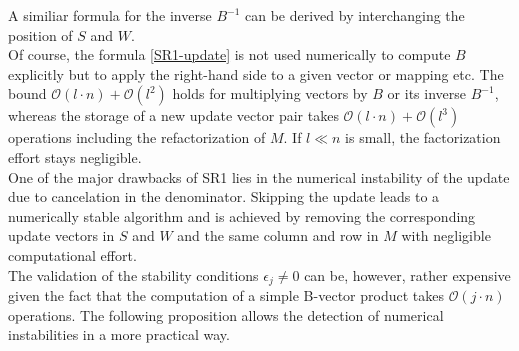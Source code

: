 \documentclass{svmult}
\begin{document}
A similiar formula for the inverse $B^{-1}$ can be derived by interchanging the position of $S$ and $W$. \\

\noindent Of course, the formula \ref{SR1-update} is not used numerically to compute $B$ explicitly but to apply the right-hand side to a given vector or mapping etc. The bound $\mathcal{O}(l\cdot n) + \mathcal{O}(l^2)$ holds for multiplying vectors by $B$ or its inverse $B^{-1}$, whereas the storage of a new update vector pair takes $\mathcal{O}(l\cdot n) + \mathcal{O}(l^3)$ operations including the refactorization of $M$. If $l \ll n$ is small, the factorization effort stays negligible. \\

One of the major drawbacks of SR1 lies in the numerical instability of the update due to cancelation in the denominator.
Skipping the update leads to a numerically stable algorithm and is achieved 
by removing the corresponding update vectors in $S$ and $W$ and the same column and row in $M$ with negligible computational effort. \\

\noindent The validation of the stability conditions $\epsilon_j \neq 0$ can be, however, rather expensive given the fact that the computation of a simple B-vector product takes $\mathcal O (j \cdot n)$ operations. The following proposition allows the detection of numerical instabilities in a more practical way.
\end{document}
